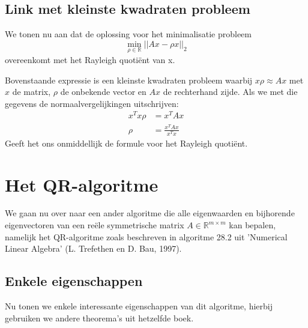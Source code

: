 \documentclass[a4paper]{article}
\begin{document}
\subsection{Link met kleinste kwadraten probleem}		
	We tonen nu aan dat de oplossing voor het minimalisatie probleem
	\[ \min_{\rho \in \mathbb{R}} ||Ax - \rho x||_2 \]
	overeenkomt met het Rayleigh quotiënt van x.
	
	\vspace{5 mm}
	\noindent Bovenstaande expressie is een kleinste kwadraten probleem waarbij $x\rho \approx Ax$ met $x$ de matrix, $\rho$ de onbekende vector en $Ax$ de rechterhand zijde. Als we met die gegevens de normaalvergelijkingen uitschrijven:
	\begin{align*}
		x^Tx  \rho &= x^TAx \\
		\rho &= \frac{x^TAx}{x^Tx}
	\end{align*}
	Geeft het ons onmiddellijk de formule voor het Rayleigh quotiënt.
\section{Het QR-algoritme}
	We gaan nu over naar een ander algoritme die alle eigenwaarden en bijhorende eigenvectoren van een reële symmetrische matrix $A \in \mathbb{R}^{m \times m}$ kan bepalen, namelijk het QR-algoritme zoals beschreven in algoritme 28.2 uit 'Numerical Linear Algebra' (L. Trefethen en D. Bau, 1997).
\subsection{Enkele eigenschappen}
	Nu tonen we enkele interessante eigenschappen van dit algoritme, hierbij gebruiken we andere theorema's uit hetzelfde boek.
\end{document}
